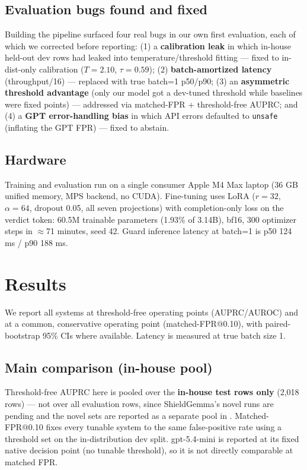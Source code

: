 \documentclass[sigconf,nonacm]{acmart}
\begin{document}
\subsection{Evaluation bugs found and fixed}
\label{sec:bugs}

Building the pipeline surfaced four real bugs in our own first evaluation, each of which we corrected before reporting: (1) a \textbf{calibration leak} in which in-house held-out dev rows had leaked into temperature/threshold fitting --- fixed to in-dist-only calibration ($T=2.10$, $\tau=0.59$); (2) \textbf{batch-amortized latency} (throughput/16) --- replaced with true batch=1 p50/p90; (3) an \textbf{asymmetric threshold advantage} (only our model got a dev-tuned threshold while baselines were fixed points) --- addressed via matched-FPR + threshold-free AUPRC; and (4) a \textbf{GPT error-handling bias} in which API errors defaulted to \texttt{unsafe} (inflating the GPT FPR) --- fixed to abstain.

\subsection{Hardware}

Training and evaluation run on a single consumer Apple M4 Max laptop (36 GB unified memory, MPS backend, no CUDA). Fine-tuning uses LoRA ($r=32$, $\alpha=64$, dropout 0.05, all seven projections) with completion-only loss on the verdict token: 60.5M trainable parameters (1.93\% of 3.14B), bf16, 300 optimizer steps in $\approx$71 minutes, seed 42. Guard inference latency at batch=1 is p50 124 ms / p90 188 ms.

\section{Results}
\label{sec:results}

We report all systems at threshold-free operating points (AUPRC/AUROC) and at a common, conservative operating point (matched-FPR@0.10), with paired-bootstrap 95\% CIs where available. Latency is measured at true batch size 1.

\subsection{Main comparison (in-house pool)}
\label{subsec:main}

Threshold-free AUPRC here is pooled over the \textbf{in-house test rows only} (2,018 rows) --- not over all evaluation rows, since ShieldGemma's novel runs are pending and the novel sets are reported as a separate pool in . Matched-FPR@0.10 fixes every tunable system to the same false-positive rate using a threshold set on the in-distribution dev split. gpt-5.4-mini is reported at its fixed native decision point (no tunable threshold), so it is not directly comparable at matched FPR.
\end{document}
